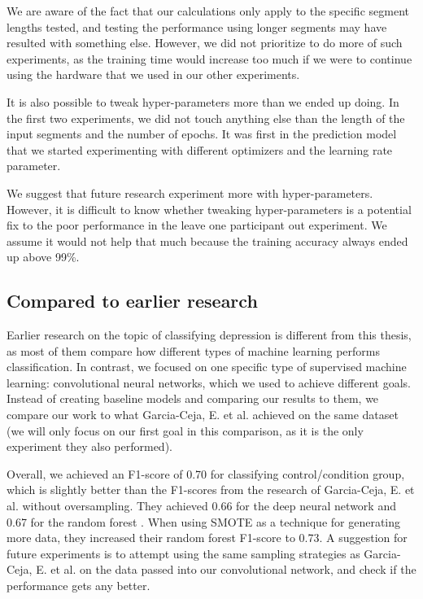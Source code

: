 We are aware of the fact that our calculations only apply to the specific segment lengths tested, and testing the performance using longer segments may have resulted with something else. However, we did not prioritize to do more of such experiments, as the training time would increase too much if we were to continue using the hardware that we used in our other experiments. 

It is also possible to tweak hyper-parameters more than we ended up doing. In the first two experiments, we did not touch anything else than the length of the input segments and the number of epochs. It was first in the prediction model that we started experimenting with different optimizers and the learning rate parameter. 

We suggest that future research experiment more with hyper-parameters. However, it is difficult to know whether tweaking hyper-parameters is a potential fix to the poor performance in the leave one participant out experiment. We assume it would not help that much because the training accuracy always ended up above 99\%. 

\subsection{Compared to earlier research}
Earlier research on the topic of classifying depression is different from this thesis, as most of them compare how different types of machine learning performs classification. In contrast, we focused on one specific type of supervised machine learning: convolutional neural networks, which we used to achieve different goals. Instead of creating baseline models and comparing our results to them, we compare our work to what Garcia-Ceja, E. et al. achieved on the same dataset (we will only focus on our first goal in this comparison, as it is the only experiment they also performed). 

Overall, we achieved an F1-score of 0.70 for classifying control/condition group, which is slightly better than the F1-scores from the research of Garcia-Ceja, E. et al. without oversampling. They achieved 0.66 for the deep neural network and 0.67 for the random forest \cite{GarciaCeja2018_classification_bipolar}. When using SMOTE as a technique for generating more data, they increased their random forest F1-score to 0.73. A suggestion for future experiments is to attempt using the same sampling strategies as Garcia-Ceja, E. et al. on the data passed into our convolutional network, and check if the performance gets any better. 

